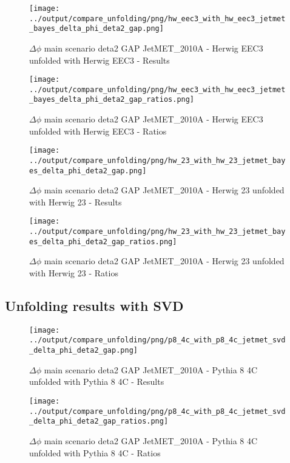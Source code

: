 \documentclass[11pt]{book}
\begin{document}
\begin{figure}[ht]
\centering
\texttt{[image: ../output/compare\_unfolding/png/hw\_eec3\_with\_hw\_eec3\_jetmet\_bayes\_delta\_phi\_deta2\_gap.png]}
\caption{$\Delta\phi$ main scenario deta2 GAP JetMET\_2010A - Herwig EEC3 unfolded with Herwig EEC3 - Results}
\label{hw_eec3_hw_eec3_jetmet_bayes_delta_phi_deta2_gap_a}
\end{figure}

\begin{figure}[ht]
\centering
\texttt{[image: ../output/compare\_unfolding/png/hw\_eec3\_with\_hw\_eec3\_jetmet\_bayes\_delta\_phi\_deta2\_gap\_ratios.png]}
\caption{$\Delta\phi$ main scenario deta2 GAP JetMET\_2010A - Herwig EEC3 unfolded with Herwig EEC3 - Ratios}
\label{hw_eec3_hw_eec3_jetmet_bayes_delta_phi_deta2_gap_b}
\end{figure}

\begin{figure}[ht]
\centering
\texttt{[image: ../output/compare\_unfolding/png/hw\_23\_with\_hw\_23\_jetmet\_bayes\_delta\_phi\_deta2\_gap.png]}
\caption{$\Delta\phi$ main scenario deta2 GAP JetMET\_2010A - Herwig 23 unfolded with Herwig 23 - Results}
\label{hw_23_hw_23_jetmet_bayes_delta_phi_deta2_gap_a}
\end{figure}

\begin{figure}[ht]
\centering
\texttt{[image: ../output/compare\_unfolding/png/hw\_23\_with\_hw\_23\_jetmet\_bayes\_delta\_phi\_deta2\_gap\_ratios.png]}
\caption{$\Delta\phi$ main scenario deta2 GAP JetMET\_2010A - Herwig 23 unfolded with Herwig 23 - Ratios}
\label{hw_23_hw_23_jetmet_bayes_delta_phi_deta2_gap_b}
\end{figure}


\clearpage
\subsection{Unfolding results with SVD}

\begin{figure}[ht]
\centering
\texttt{[image: ../output/compare\_unfolding/png/p8\_4c\_with\_p8\_4c\_jetmet\_svd\_delta\_phi\_deta2\_gap.png]}
\caption{$\Delta\phi$ main scenario deta2 GAP JetMET\_2010A - Pythia 8 4C unfolded with Pythia 8 4C - Results}
\label{p8_p8_jetmet_svd_delta_phi_deta2_gap_a}
\end{figure}

\begin{figure}[ht]
\centering
\texttt{[image: ../output/compare\_unfolding/png/p8\_4c\_with\_p8\_4c\_jetmet\_svd\_delta\_phi\_deta2\_gap\_ratios.png]}
\caption{$\Delta\phi$ main scenario deta2 GAP JetMET\_2010A - Pythia 8 4C unfolded with Pythia 8 4C - Ratios}
\label{p8_p8_jetmet_svd_delta_phi_deta2_gap_b}
\end{figure}
\end{document}
